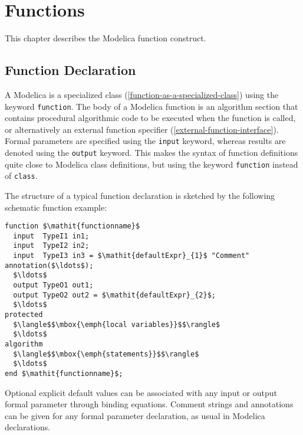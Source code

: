 \chapter{Functions}\label{functions}

This chapter describes the Modelica function construct.

\section{Function Declaration}\label{function-declaration}

A Modelica  is a specialized class (\cref{function-as-a-specialized-class}) using the keyword \lstinline!function!.
The body of a Modelica function is an algorithm section that contains procedural algorithmic code to be executed when the function is called, or alternatively an external function specifier (\cref{external-function-interface}).
Formal parameters are specified using the \lstinline!input! keyword, whereas results are denoted using the \lstinline!output! keyword.
This makes the syntax of function definitions quite close to Modelica class definitions, but using the keyword \lstinline!function! instead of \lstinline!class!.

\begin{nonnormative}
The structure of a typical function declaration is sketched by the following schematic function example:
\begin{lstlisting}[language=modelica]
function $\mathit{functionname}$
  input  TypeI1 in1;
  input  TypeI2 in2;
  input  TypeI3 in3 = $\mathit{defaultExpr}_{1}$ "Comment" annotation($\ldots$);
  $\ldots$
  output TypeO1 out1;
  output TypeO2 out2 = $\mathit{defaultExpr}_{2}$;
  $\ldots$
protected
  $\langle$$\mbox{\emph{local variables}}$$\rangle$
  $\ldots$
algorithm
  $\langle$$\mbox{\emph{statements}}$$\rangle$
  $\ldots$
end $\mathit{functionname}$;
\end{lstlisting}
\end{nonnormative}

Optional explicit default values can be associated with any input or output formal parameter through binding equations.
Comment strings and annotations can be given for any formal parameter declaration, as usual in Modelica declarations.

